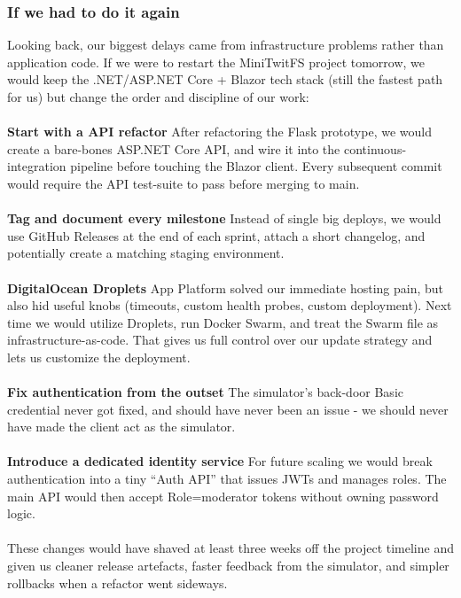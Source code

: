 \subsubsection{If we had to do it again}
Looking back, our biggest delays came from infrastructure problems rather than application code. If we were to restart the MiniTwitFS project tomorrow, we would keep the .NET/ASP.NET Core + Blazor tech stack (still the fastest path for us) but change the order and discipline of our work:\\\\
\textbf{Start with a API refactor}
After refactoring the Flask prototype, we would create a bare-bones ASP.NET Core API, and wire it into the continuous-integration pipeline before touching the Blazor client. Every subsequent commit would require the API test-suite to pass before merging to main.\\\\
\textbf{Tag and document every milestone}
Instead of single big deploys, we would use GitHub Releases at the end of each sprint, attach a short changelog, and potentially create a matching staging environment.\\\\
\textbf{DigitalOcean Droplets}
App Platform solved our immediate hosting pain, but also hid useful knobs (timeouts, custom health probes, custom deployment). Next time we would utilize Droplets, run Docker Swarm, and treat the Swarm file as infrastructure-as-code. That gives us full control over our update strategy and lets us customize the deployment.\\\\
\textbf{Fix authentication from the outset}
The simulator’s back-door Basic credential never got fixed, and should have never been an issue - we should never have made the client act as the simulator.\\\\
\textbf{Introduce a dedicated identity service}
For future scaling we would break authentication into a tiny “Auth API” that issues JWTs and manages roles. The main API would then accept Role=moderator tokens without owning password logic.\\\\
These changes would have shaved at least three weeks off the project timeline and given us cleaner release artefacts, faster feedback from the simulator, and simpler rollbacks when a refactor went sideways.